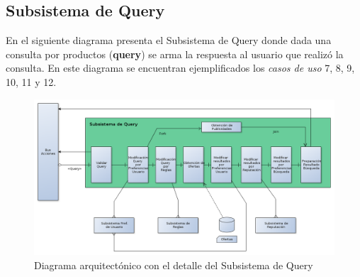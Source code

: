 \subsection{Subsistema de Query}

En el siguiente diagrama presenta el \textsf{Subsistema de Query} donde dada una consulta por productos (\textbf{query}) se arma la respuesta al usuario que realizó la consulta. En este diagrama se encuentran ejemplificados los \emph{casos de uso} 7, 8, 9, 10, 11 y 12.

\begin{figure}[H]
\centering
\includegraphics[width=\textwidth]{graficos/arch/subsistema_query.png}
\caption{Diagrama arquitectónico con el detalle del \textsf{Subsistema de Query}}
\end{figure}
